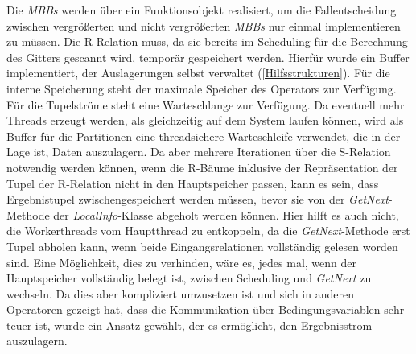\documentclass[a4paper,12pt,twoside]{article}
\newcommand{\Fb}[1]{\textit{#1}} %
\begin{document}
Die \Fb{MBBs} werden über ein Funktionsobjekt realisiert, um die Fallentscheidung zwischen vergrößerten und nicht vergrößerten \Fb{MBBs} nur einmal implementieren zu müssen. Die R-Relation muss, da sie bereits im Scheduling für die Berechnung des Gitters gescannt wird, temporär gespeichert werden. Hierfür wurde ein Buffer implementiert, der Auslagerungen selbst verwaltet (\autoref{Hilfsstrukturen}). Für die interne Speicherung steht der maximale Speicher des Operators zur Verfügung. Für die Tupelströme steht eine Warteschlange zur Verfügung. Da eventuell mehr Threads erzeugt werden, als gleichzeitig auf dem System laufen können, wird als Buffer für die Partitionen eine threadsichere Warteschleife verwendet, die in der Lage ist, Daten auszulagern. Da aber mehrere Iterationen über die S-Relation notwendig werden können, wenn die R-Bäume inklusive der Repräsentation der Tupel der R-Relation nicht in den Hauptspeicher passen, kann es sein, dass Ergebnistupel zwischengespeichert werden müssen, bevor sie von der \Fb{GetNext}-Methode der \Fb{LocalInfo}-Klasse abgeholt werden können. Hier hilft es auch nicht, die Workerthreads vom Hauptthread zu entkoppeln, da die \Fb{GetNext}-Methode erst Tupel abholen kann, wenn beide Eingangsrelationen vollständig gelesen worden sind. Eine Möglichkeit, dies zu verhinden, wäre es, jedes mal, wenn der Hauptspeicher vollständig belegt ist, zwischen Scheduling und \Fb{GetNext} zu wechseln. Da dies aber kompliziert umzusetzen ist und sich in anderen Operatoren gezeigt hat, dass die Kommunikation über Bedingungsvariablen sehr teuer ist, wurde ein Ansatz gewählt, der es ermöglicht, den Ergebnisstrom auszulagern.
\end{document}
